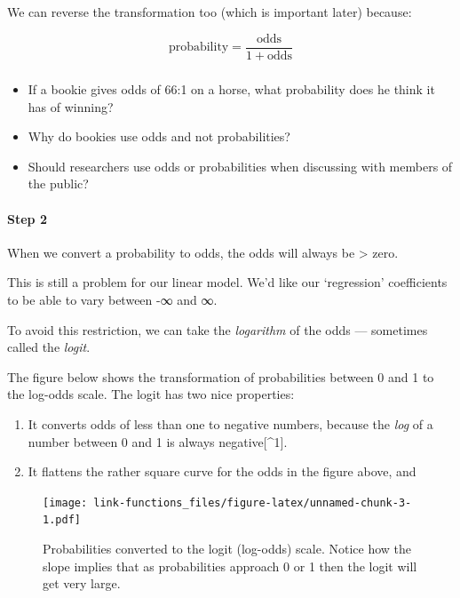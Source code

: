 \documentclass[]{article}
\let\oldparagraph\paragraph
\renewcommand{\paragraph}[1]{\oldparagraph{#1}\mbox{}}
\let\oldsubparagraph\subparagraph
\renewcommand{\subparagraph}[1]{\oldsubparagraph{#1}\mbox{}}
\theoremstyle{definition}
\theoremstyle{definition}
\theoremstyle{definition}
\theoremstyle{remark}
\begin{document}
We can reverse the transformation too (which is important later)
because:

\[\textrm{probability} = \dfrac{\textrm{odds}}{1+\textrm{odds}}\]

\subparagraph{}\label{section-21}

\begin{itemize}
\item
  If a bookie gives odds of 66:1 on a horse, what probability does he
  think it has of winning?
\item
  Why do bookies use odds and not probabilities?
\item
  Should researchers use odds or probabilities when discussing with
  members of the public?
\end{itemize}

\paragraph{Step 2}\label{step-2}

When we convert a probability to odds, the odds will always be
\textgreater{} zero.

This is still a problem for our linear model. We'd like our `regression'
coefficients to be able to vary between -∞ and ∞.

To avoid this restriction, we can take the \emph{logarithm} of the odds
--- sometimes called the \emph{logit}.

The figure below shows the transformation of probabilities between 0 and
1 to the log-odds scale. The logit has two nice properties:

\begin{enumerate}
\def\labelenumi{\arabic{enumi}.}
\item
  It converts odds of less than one to negative numbers, because the
  \emph{log} of a number between 0 and 1 is always negative{[}\^{}1{]}.
\item
  It flattens the rather square curve for the odds in the figure above,
  and
\end{enumerate}

\begin{figure}
\centering
\texttt{[image: link-functions\_files/figure-latex/unnamed-chunk-3-1.pdf]}
\caption{\label{fig:unnamed-chunk-3}Probabilities converted to the logit
(log-odds) scale. Notice how the slope implies that as probabilities
approach 0 or 1 then the logit will get very large.}
\end{figure}
\end{document}
